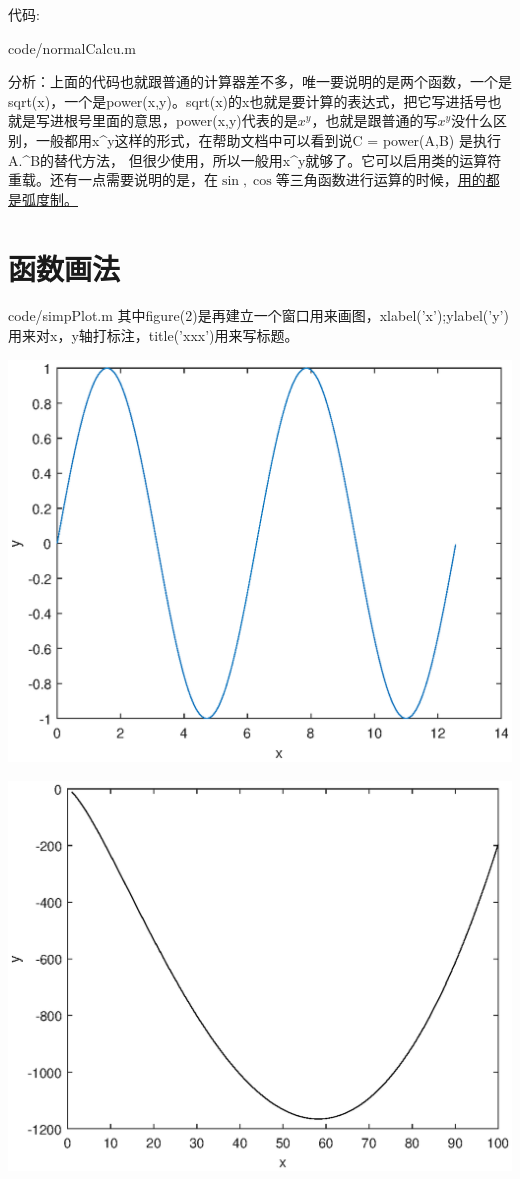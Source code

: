 \documentclass{hfutpaper}
\makeatletter
\newcommand{\figcaption}{\def\@captype{figure}\caption}
\makeatother
\begin{document}
代码:

{code/normalCalcu.m}

分析：上面的代码也就跟普通的计算器差不多，唯一要说明的是两个函数，一个是sqrt(x)，一个是power(x,y)。sqrt(x)的x也就是要计算的表达式，把它写进括号也就是写进根号里面的意思，power(x,y)代表的是$x^y$，也就是跟普通的写$x^y$没什么区别，一般都用x\^{}y这样的形式，在帮助文档中可以看到说C = power(A,B) 是执行 A.\^{}B的替代方法， 但很少使用，所以一般用x\^{}y就够了。它可以启用类的运算符重载。还有一点需要说明的是，在$\sin,\cos$等三角函数进行运算的时候，\underline{用的都是弧度制。}
\section*{函数画法}

{code/simpPlot.m}
其中figure(2)是再建立一个窗口用来画图，xlabel('x');ylabel('y')用来对x，y轴打标注，title('xxx')用来写标题。

\includegraphics{figure/plot1.eps}
\figcaption{$y=sin(x)$}
\includegraphics{figure/plot2.eps}
\figcaption{$y=x^2-2*x+\sqrt{x}-x^{\frac{1}{3}}-10*x^{1.5}$}
\end{document}
